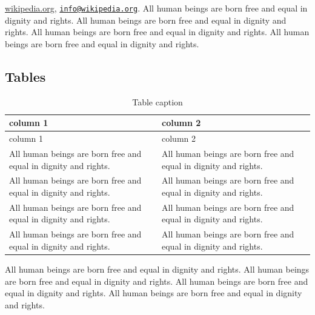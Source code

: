 \documentclass[
  ngerman,
  american,
  letterpaper,
  DIV=11,
  numbers=noendperiod]{scrartcl}
\begin{document}
\href{https://www.wikipedia.org/}{wikipedia.org},
\href{mailto:info@wikipedia.org}{\nolinkurl{info@wikipedia.org}}. All
human beings are born free and equal in dignity and rights. All human
beings are born free and equal in dignity and rights. All human beings
are born free and equal in dignity and rights. All human beings are born
free and equal in dignity and rights.

\subsection{Tables}\label{tables}

\begin{longtable}[]{@{}
  >{\raggedright\arraybackslash}p{}
  >{\raggedright\arraybackslash}p{}@{}}
\caption{Table caption}\tabularnewline
\toprule\noalign{}
\begin{minipage}[b]{\linewidth}\raggedright
column 1
\end{minipage} & \begin{minipage}[b]{\linewidth}\raggedright
column 2
\end{minipage} \\
\midrule\noalign{}
\endfirsthead
\toprule\noalign{}
\begin{minipage}[b]{\linewidth}\raggedright
column 1
\end{minipage} & \begin{minipage}[b]{\linewidth}\raggedright
column 2
\end{minipage} \\
\midrule\noalign{}
\endhead
\bottomrule\noalign{}
\endlastfoot
All human beings are born free and equal in dignity and rights. & All
human beings are born free and equal in dignity and rights. \\
All human beings are born free and equal in dignity and rights. & All
human beings are born free and equal in dignity and rights. \\
All human beings are born free and equal in dignity and rights. & All
human beings are born free and equal in dignity and rights. \\
All human beings are born free and equal in dignity and rights. & All
human beings are born free and equal in dignity and rights. \\
\end{longtable}

All human beings are born free and equal in dignity and rights. All
human beings are born free and equal in dignity and rights. All human
beings are born free and equal in dignity and rights. All human beings
are born free and equal in dignity and rights.
\end{document}
